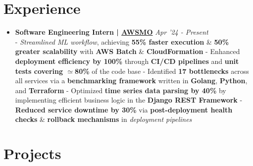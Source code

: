\documentclass[a4paper,10pt]{extarticle} %
\begin{document}
\section{\textcolor{primary}{Experience}}
\vspace{+0.1cm}

\begin{itemize}[leftmargin=0.55cm, rightmargin=0.2cm, label={\Large\textbullet}]

\item \textbf{Software Engineering Intern | \href{https://awsmo.ai/}{AWSMO}} \hfill{\textit{Apr '24 - Present}} \\
- \textit{Streamlined ML workflow}, achieving \textbf{55\% faster execution} \& \textbf{50\% greater scalability} with \textbf{AWS Batch} \& \textbf{CloudFormation} \newline
- Enhanced \textbf{deployment efficiency by 100\%} through \textbf{CI/CD pipelines} and \textbf{unit tests covering $\simeq$80\%} of the code base \newline
- Identified \textbf{17 bottlenecks} across all services via a \textbf{benchmarking framework} written in \textbf{Golang}, \textbf{Python}, and \textbf{Terraform} \newline
- Optimized \textbf{time series data parsing by 40\%} by implementing efficient business logic in the \textbf{Django REST Framework} \newline
- \textbf{Reduced service downtime by 30\%} via \textbf{post-deployment health checks} \& \textbf{rollback mechanisms} in \textit{deployment pipelines}

\end{itemize}


 \vspace{0.2cm}
\section{\textcolor{primary}{Projects}}
 \vspace{0.1cm}
\end{document}
